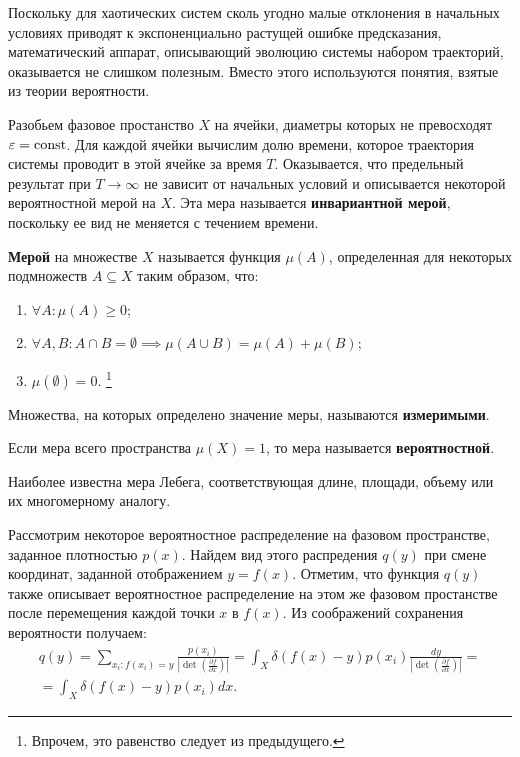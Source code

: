 
Поскольку для хаотических систем сколь угодно малые отклонения в начальных условиях приводят к экспоненциально растущей ошибке предсказания, математический аппарат, описывающий эволюцию системы набором траекторий, оказывается не слишком полезным.
Вместо этого используются понятия, взятые из теории вероятности.

Разобьем фазовое простанство $X$ на ячейки, диаметры которых не превосходят $\varepsilon = \mathrm{const}$.
Для каждой ячейки вычислим долю времени, которое траектория системы проводит в этой ячейке за время $T$.
Оказывается, что предельный результат при $T \to \infty$ не зависит от начальных условий и описывается некоторой вероятностной мерой на $X$. 
Эта мера называется \textbf{инвариантной мерой}, поскольку ее вид не меняется с течением времени.

\begin{definition}[Мера]
    \textbf{Мерой} на множестве $X$ называется функция $\mu(A)$, определенная для некоторых подмножеств $A \subseteq X$ таким образом, что:
    \begin{enumerate}
    \item
        $\forall A: \mu(A) \geq 0$;
    \item
        $\forall A, B: A \cap B = \emptyset \implies \mu\left( A \cup B \right) = \mu\left( A \right) + \mu\left( B \right)$;
    \item
        $\mu\left( \emptyset \right) = 0$. \footnote{Впрочем, это равенство следует из предыдущего.}
    \end{enumerate}
    
    Множества, на которых определено значение меры, называются \textbf{измеримыми}.
    
    Если мера всего пространства $\mu\left( X \right) = 1$, то мера называется \textbf{вероятностной}.
    
    Наиболее известна мера Лебега, соответствующая длине, площади, объему или их многомерному аналогу.
\end{definition}


Рассмотрим некоторое вероятностное распределение на фазовом пространстве, заданное плотностью $p(x)$.
Найдем вид этого распредения $q(y)$ при смене координат, заданной отображением $y = f(x)$.
Отметим, что функция $q(y)$ также описывает вероятностное распределение на этом же фазовом простанстве после перемещения каждой точки $x$ в $f(x)$. Из соображений сохранения вероятности получаем:
\begin{gather}
\nonumber
    q(y) =
    \sum_{x_i: f\left( x_i \right) = y} \frac{p\left( x_i \right)}{\left| \det\left( \frac{\partial f}{\partial x} \right) \right|} =
    \int_{X} \delta\left( f(x) - y \right) p\left( x_i \right) \frac{dy}{\left| \det\left( \frac{\partial f}{\partial x} \right) \right|} =\\=
\label{6_1}
    \int_{X} \delta\left( f(x) - y \right) p\left( x_i \right) dx.
\end{gather}


